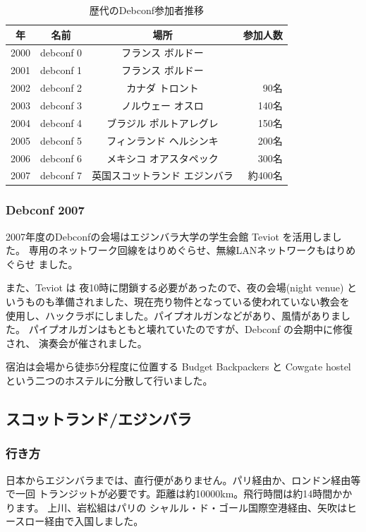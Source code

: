\documentclass[mingoth,a4paper]{jsarticle}
\begin{document}
\begin{table}[H]
\caption{歴代のDebconf参加者推移}
\label{tab:debconflist}
 \begin{center}
 {\footnotesize
 \begin{tabular}{|c|c|c|r|}
 \hline
 年 & 名前 & 場所 & 参加人数 \\
 \hline
 2000 & debconf 0 &フランス ボルドー & \\
 2001 & debconf 1 &フランス ボルドー & \\
 2002 & debconf 2 &カナダ トロント & 90名 \\
 2003 & debconf 3 &ノルウェー オスロ & 140名 \\
 2004 & debconf 4 &ブラジル ポルトアレグレ &  150名 \\
 2005 & debconf 5 &フィンランド ヘルシンキ & 200名 \\
 2006 & debconf 6 &メキシコ オアスタペック & 300名 \\
 2007 & debconf 7 &英国スコットランド エジンバラ & 約400名 \\
 \hline
 \end{tabular}
 }
 \end{center}
\end{table}

\subsubsection{Debconf 2007}

2007年度のDebconfの会場はエジンバラ大学の学生会館 Teviot を活用しました。
専用のネットワーク回線をはりめぐらせ、無線LANネットワークもはりめぐらせ
ました。

また、Teviot は 夜10時に閉鎖する必要があったので、夜の会場(night venue) 
というものも準備されました、現在売り物件となっている使われていない教会を
使用し、ハックラボにしました。パイプオルガンなどがあり、風情がありました。
パイプオルガンはもともと壊れていたのですが、Debconf の会期中に修復され、
演奏会が催されました。

宿泊は会場から徒歩5分程度に位置する Budget Backpackers と Cowgate hostel 
という二つのホステルに分散して行いました。

\subsection{スコットランド/エジンバラ}

\subsubsection{行き方}
  日本からエジンバラまでは、直行便がありません。パリ経由か、ロンドン経由等で一回
  トランジットが必要です。距離は約10000km。飛行時間は約14時間かかります。
  上川、岩松組はパリの シャルル・ド・ゴール国際空港経由、矢吹はヒースロー経由で入国しました。
\end{document}
